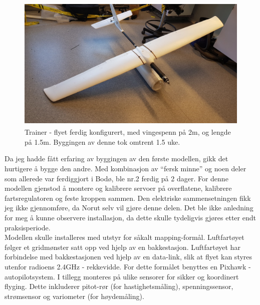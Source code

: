 \documentclass[12pt, a4paper]{article}
\begin{document}
\begin{figure}[ht]
	\centering
	\includegraphics[width=.6\textwidth, height = 6.5cm]{bilder/forste_fly_ferdigstilt.jpg}
	\caption[Trainer-fly]{Trainer - flyet ferdig konfigurert, med vingespenn på 2m, og lengde på 1.5m. Byggingen av denne tok omtrent 1.5 uke. }
\end{figure}

Da jeg hadde fått erfaring av byggingen av den første modellen, gikk det hurtigere å bygge den andre. Med kombinasjon av ``fersk minne'' og noen deler som allerede var ferdiggjort i Bodø, ble nr.2 ferdig på 2 dager. For denne modellen gjenstod å montere og kalibrere servoer på overflatene, kalibrere fartsregulatoren og feste kroppen sammen. Den elektriske sammensetningen fikk jeg ikke gjennomføre, da Norut selv vil gjøre denne delen. Det ble ikke anledning for meg å kunne observere installasjon, da dette skulle tydeligvis gjøres etter endt praksisperiode. \\
Modellen skulle installeres med utstyr for såkalt mapping-formål. Luftfartøyet følger et gridmønster satt opp ved hjelp av en bakkestasjon. Luftfartøyet har forbindelse med bakkestasjonen ved hjelp av en data-link, slik at flyet kan styres utenfor radioens 2.4GHz - rekkevidde. For dette formålet benyttes en Pixhawk - autopilotsystem. I tillegg monteres på ulike sensorer for sikker og koordinert flyging. Dette inkluderer pitot-rør (for hastighetsmåling), spenningssensor, strømsensor og variometer (for høydemåling). 
\end{document}
